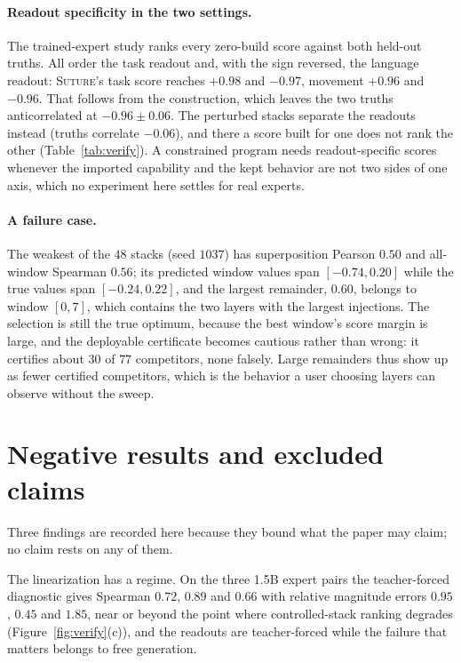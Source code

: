\documentclass{article}
\theoremstyle{plain}
\theoremstyle{definition}
\theoremstyle{remark}
\begin{document}
\paragraph{Readout specificity in the two settings.}
The trained-expert study ranks every zero-build score against both held-out
truths. All order the task readout and, with the sign reversed, the
language readout: \textsc{Suture}'s task score reaches $+0.98$ and $-0.97$,
movement $+0.96$ and $-0.96$. That follows from the construction, which leaves
the two truths anticorrelated at $-0.96\pm0.06$. The perturbed stacks separate
the readouts instead (truths correlate $-0.06$), and there a score built for one
does not rank the other (Table~\ref{tab:verify}). A constrained program needs
readout-specific scores whenever the imported capability and the kept behavior
are not two sides of one axis, which no experiment here settles for real experts.

\paragraph{A failure case.}
The weakest of the $48$ stacks (seed $1037$) has superposition Pearson $0.50$ and
all-window Spearman $0.56$; its predicted window values span $[-0.74,0.20]$ while
the true values span $[-0.24,0.22]$, and the largest remainder, $0.60$, belongs
to window $[0,7]$, which contains the two layers with the largest injections.
The selection is still the true optimum, because the best window's score margin
is large, and the deployable certificate becomes cautious rather than wrong: it
certifies about $30$ of $77$ competitors, none falsely. Large remainders thus
show up as fewer certified competitors, which is the behavior a user choosing layers can
observe without the sweep.

\section{Negative results and excluded claims}
\label{app:negative}

Three findings are recorded here because they bound what the paper may claim; no
claim rests on any of them.

The linearization has a regime. On the three 1.5B expert pairs the teacher-forced
diagnostic gives Spearman $0.72$, $0.89$ and $0.66$ with relative magnitude
errors $0.95$, $0.45$ and $1.85$, near or beyond the point where controlled-stack
ranking degrades (Figure~\ref{fig:verify}(c)), and the readouts are
teacher-forced while the failure that matters belongs to free generation.
\end{document}
